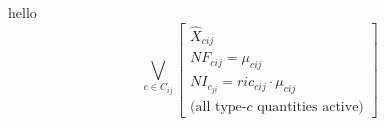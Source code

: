 hello
\begin{equation}
\bigvee_{c \in C_{ij}}
\begin{bmatrix}
  \hat{X}_{cij} \\
  NF_{cij} = \mu_{cij} \\
  NI_{c}_{ji} = ric_{cij}\cdot\mu_{cij} \\
  \text{(all type-}c\text{ quantities active)}
\end{bmatrix}
\end{equation}
